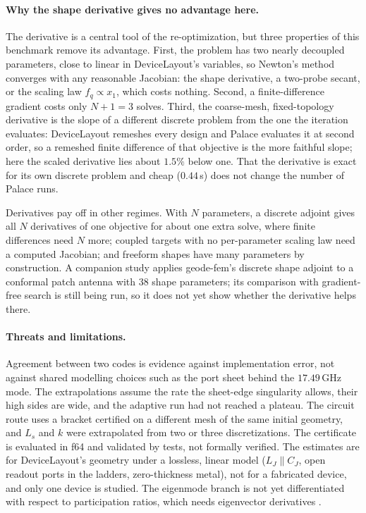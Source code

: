 \documentclass{anvil-paper}
\begin{document}
\paragraph{Why the shape derivative gives no advantage here.}
The derivative is a central tool of the re-optimization, but three
properties of this benchmark remove its advantage. First, the problem has
two nearly decoupled parameters, close to linear in DeviceLayout's
variables, so Newton's method converges with any reasonable Jacobian: the
shape derivative, a two-probe secant, or the scaling law $f_q \propto x_1$,
which costs nothing. Second, a finite-difference gradient costs only $N+1 =
3$ solves. Third, the coarse-mesh, fixed-topology derivative is the slope
of a different discrete problem from the one the iteration evaluates:
DeviceLayout remeshes every design and Palace evaluates it at second
order, so a remeshed finite difference of that objective is the more
faithful slope; here the scaled derivative lies about $1.5\%$ below one. That the
derivative is exact for its own discrete problem and cheap ($0.44$\,s)
does not change the number of Palace runs.

Derivatives pay off in other regimes. With $N$ parameters, a discrete
adjoint gives all $N$ derivatives of one objective for about one extra
solve, where finite differences need $N$ more; coupled targets with no
per-parameter scaling law need a computed Jacobian; and freeform shapes
have many parameters by construction. A companion study
\citep{walters2026conformal} applies geode-fem's discrete shape adjoint to
a conformal patch antenna with 38 shape parameters; its comparison with
gradient-free search is still being run, so it does not yet show whether
the derivative helps there.

\paragraph{Threats and limitations.}
Agreement between two codes is evidence against implementation error, not
against shared modelling choices such as the port sheet behind the
$17.49$\,GHz mode. The extrapolations assume the rate the sheet-edge singularity
allows, their high sides are wide, and the adaptive run had not reached a
plateau. The circuit route uses a bracket certified on a different mesh of
the same initial geometry, and $L_s$ and $k$ were extrapolated from two or
three discretizations. The certificate is evaluated in f64 and validated by
tests, not formally verified. The estimates are for DeviceLayout's geometry
under a lossless, linear model ($L_J \parallel C_J$, open readout ports in
the ladders, zero-thickness metal), not for a fabricated device, and only
one device is studied. The eigenmode branch is
not yet differentiated with respect to participation ratios, which needs
eigenvector derivatives \citep{nelson1976simplified}.
\end{document}
